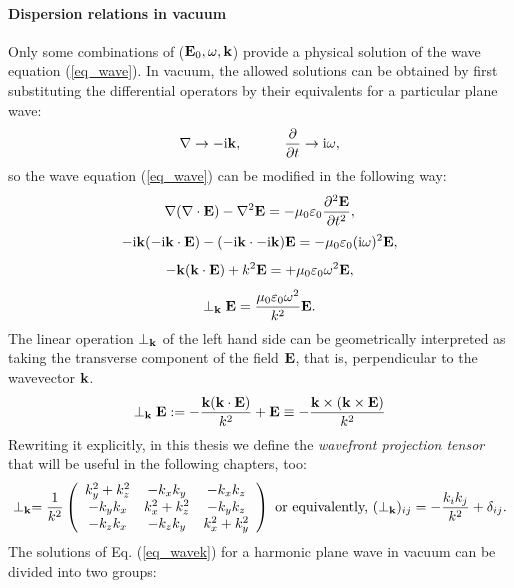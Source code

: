 \paragraph{Dispersion relations in vacuum} %
Only some combinations of ($\mathbf{E}_0, \omega, {\mathbf{k}}$) provide a physical solution of the wave equation (\ref{eq_wave}). In vacuum, the allowed solutions can be obtained by first substituting the differential operators by their equivalents for a particular plane wave:
\begin{equation} \nabla \rightarrow -{\mathrm i}{\mathbf{k}}, \quad\quad\quad 
\frac{\partial} {\partial t} \rightarrow {\mathrm i}\omega, \label{eq_difftok}\end{equation}
so the wave equation (\ref{eq_wave}) can be modified in the following way:
$$					\nabla (\nabla \cdot \mathbf{E}) - \nabla^2 \mathbf{E}				  =	-\mu_0 \varepsilon_0 \frac{\partial^{2} \mathbf{E}}{\partial t^{2}},  $$
$$				 -{\mathrm i}{\mathbf{k}} (-{\mathrm i}{\mathbf{k}} \cdot \mathbf{E})  - (-{\mathrm i}{\mathbf{k}} \cdot -{\mathrm i}{\mathbf{k}}) \mathbf{E} = -\mu_0 \varepsilon_0 ({\mathrm i}\omega)^2 \mathbf{E}, $$
$$   - {\mathbf{k}} ({\mathbf{k}} \cdot \mathbf{E})      +          k^2 \mathbf{E}            = +\mu_0 \varepsilon_0 \omega^{2} \mathbf{E},  $$
\begin{equation}  \perp_{\mathbf{k}}\mathbf{E}            = \frac{\mu_0 \varepsilon_0 \omega^{2}}{k^2} \mathbf{E}.  \label{eq_wavek}\end{equation}
The linear operation $\perp_{\mathbf{k}}$ of the left hand side can be geometrically interpreted as taking the transverse component of the field $\mathbf{E}$, that is, perpendicular to the wavevector ${\mathbf{k}}$. 
\begin{equation} \perp_{\mathbf{k}}\mathbf{E} :=  -\frac{{\mathbf{k}} ({\mathbf{k}} \cdot \mathbf{E})}{k^2} + \mathbf{E}     \equiv     - \frac{{\mathbf{k}}\times({\mathbf{k}}\times\mathbf{E})}{k^2} \label{eq_transverse1}\end{equation}
Rewriting it explicitly, in this thesis we define the \textit{wavefront projection tensor} that will be useful in the following chapters, too:
\begin{equation} \perp_{\mathbf{k}} = \frac{1}{k^2} 
\left(\begin{array}{ccc} 
	k_y^2+k_z^2  	& -k_x k_y 		& -k_x k_z \\ 
	-k_y k_x 		& k_x^2+k_z^2	& -k_y k_z \\ 
	-k_z k_x 		& -k_z k_y		& k_x^2+k_y^2
	\end{array} \right) 
\text{ or equivalently, }
(\perp_{\mathbf{k}})_{ij} = - \frac{k_i k_j}{k^2} + \delta_{ij} .  \label{eq_transverse2}\end{equation}
The solutions of Eq. (\ref{eq_wavek}) for a harmonic plane wave in vacuum can be divided into two groups: %
